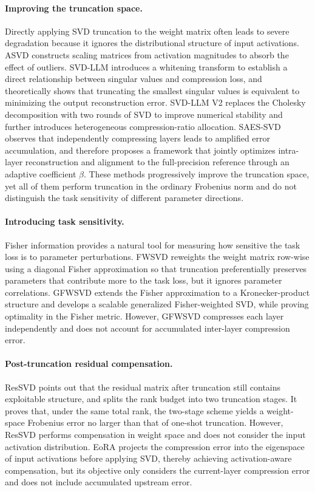 \documentclass[a4paper,fleqn]{cas-dc}
\begin{document}
\paragraph{Improving the truncation space.}
Directly applying SVD truncation to the weight matrix often leads to severe degradation because it ignores the distributional structure of input activations. ASVD constructs scaling matrices from activation magnitudes to absorb the effect of outliers. SVD-LLM introduces a whitening transform to establish a direct relationship between singular values and compression loss, and theoretically shows that truncating the smallest singular values is equivalent to minimizing the output reconstruction error. SVD-LLM V2 replaces the Cholesky decomposition with two rounds of SVD to improve numerical stability and further introduces heterogeneous compression-ratio allocation. SAES-SVD observes that independently compressing layers leads to amplified error accumulation, and therefore proposes a framework that jointly optimizes intra-layer reconstruction and alignment to the full-precision reference through an adaptive coefficient $\beta$. These methods progressively improve the truncation space, yet all of them perform truncation in the ordinary Frobenius norm and do not distinguish the task sensitivity of different parameter directions.

\paragraph{Introducing task sensitivity.}
Fisher information provides a natural tool for measuring how sensitive the task loss is to parameter perturbations. FWSVD reweights the weight matrix row-wise using a diagonal Fisher approximation so that truncation preferentially preserves parameters that contribute more to the task loss, but it ignores parameter correlations. GFWSVD extends the Fisher approximation to a Kronecker-product structure and develops a scalable generalized Fisher-weighted SVD, while proving optimality in the Fisher metric. However, GFWSVD compresses each layer independently and does not account for accumulated inter-layer compression error.

\paragraph{Post-truncation residual compensation.}
ResSVD points out that the residual matrix after truncation still contains exploitable structure, and splits the rank budget into two truncation stages. It proves that, under the same total rank, the two-stage scheme yields a weight-space Frobenius error no larger than that of one-shot truncation. However, ResSVD performs compensation in weight space and does not consider the input activation distribution. EoRA projects the compression error into the eigenspace of input activations before applying SVD, thereby achieving activation-aware compensation, but its objective only considers the current-layer compression error and does not include accumulated upstream error.
\end{document}
